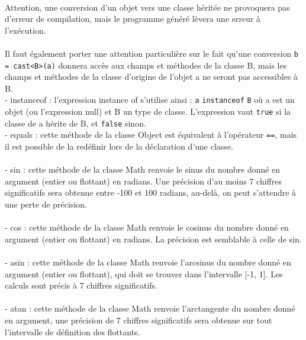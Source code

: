 \documentclass[12pt]{article}
\begin{document}
~\\
Attention, une conversion d'un objet vers une classe héritée ne provoquera pas d'erreur de compilation, mais le programme généré lèvera une erreur à l'exécution.
\\\\Il faut également porter une attention particulière sur le fait qu'une conversion \verb?b = cast<B>(a)? donnera accès aux champs et méthodes de la classe B, mais les champs et méthodes de la classe d'origine de l'objet a ne seront pas accessibles à B.
\\- instanceof : l'expression instance of s'utilise ainsi : \verb?a? \verb?instanceof? \verb?B? où a est un objet (ou l'expression null) et B un type de classe. L'expression vaut \verb?true? si la classe de a hérite de B, et \verb?false? sinon.
\\- equals : cette méthode de la classe Object est équivalent à l'opérateur \verb?==?, mais il est possible de la redéfinir lors de la déclaration d'une classe.\\
\\- sin : cette méthode de la classe Math renvoie le sinus du nombre donné en argument (entier ou flottant) en radians. Une précision d'au moins $7$ chiffres significatifs
sera obtenue entre -100 et 100 radians, au-delà, on peut s'attendre à une perte de précision.\\
\\- cos : cette méthode de la classe Math renvoie le cosinus du nombre donné en argument (entier ou flottant) en radians. La précision est semblable à celle de sin.\\
\\- asin : cette méthode de la classe Math renvoie l'arcsinus du nombre donné en argument (entier ou flottant), qui doit se trouver dans l'intervalle [-1, 1]. 
Les calculs sont précis à $7$ chiffres significatifs.\\
\\- atan : cette méthode de la classe Math renvoie l'arctangente du nombre donné en argument, une précision de $7$ chiffres significatifs sera obtenue sur tout 
l'intervalle de définition des flottants.\\
\end{document}

